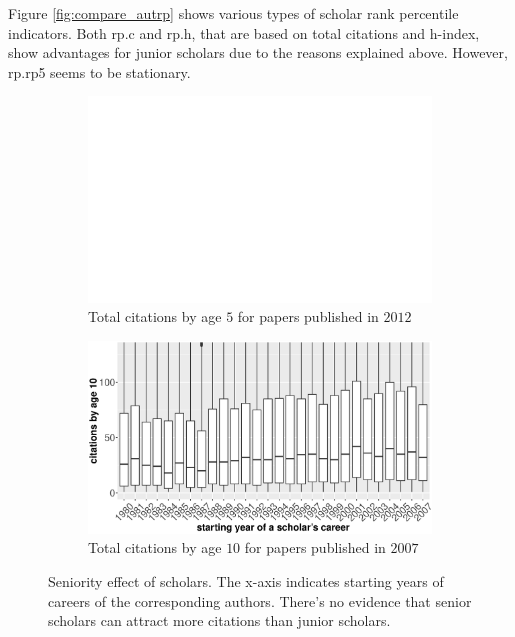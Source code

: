 \begin{refsection}
Figure \ref{fig:compare_autrp} shows various types of scholar rank percentile indicators. Both rp.c and rp.h, that are based on total citations and h-index, show advantages for junior scholars due to the reasons explained above. However, rp.rp5 seems to be stationary. 


\begin{figure}[h!]
     \centering
     \begin{subfigure}[b]{0.48\textwidth}
         \centering
         \includegraphics[width=\textwidth]{figures/exploratory/seniority_age5.eps}
         \caption{Total citations by age $5$ for papers published in $2012$}
     \end{subfigure}
     \hfill
     \begin{subfigure}[b]{0.5\textwidth}
         \centering
         \includegraphics[width=\textwidth]{figures/exploratory/seniority_age10.eps}
         \caption{Total citations by age $10$ for papers published in $2007$}
     \end{subfigure}
    \caption{Seniority effect of scholars. The x-axis indicates starting years of careers of the corresponding authors. There's no evidence that senior scholars can attract more citations than junior scholars.}
    \label{fig:seniority}
\end{figure}


\end{refsection}
